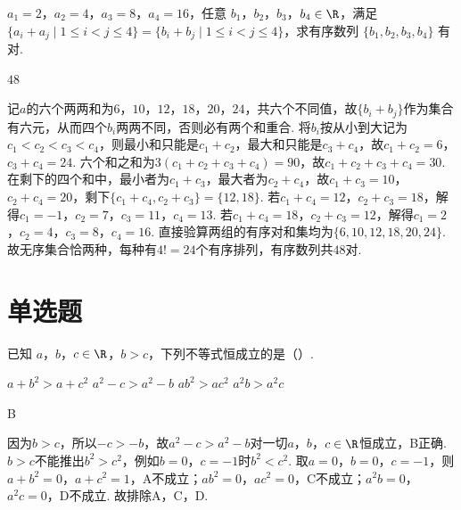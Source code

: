 \begin{problem}
\(a_1=2\)，\(a_2=4\)，\(a_3=8\)，\(a_4=16\)，任意 \(b_1\)，\(b_2\)，\(b_3\)，\(b_4\in \R\)，满足 \(\{a_i+a_j\mid 1\le i<j\le 4\}=\{b_i+b_j\mid 1\le i<j\le 4\}\)，求有序数列 \(\{b_1,b_2,b_3,b_4\}\) 有\fillinblank{} 对.
\end{problem}

\begin{answer}
\(48\)
\end{answer}

\begin{solution}
记\(a\)的六个两两和为\(6\)，\(10\)，\(12\)，\(18\)，\(20\)，\(24\)，共六个不同值，故\(\{b_{i}+b_{j}\}\)作为集合有六元，从而四个\(b_{i}\)两两不同，否则必有两个和重合. 将\(b_{i}\)按从小到大记为\(c_{1}<c_{2}<c_{3}<c_{4}\)，则最小和只能是\(c_{1}+c_{2}\)，最大和只能是\(c_{3}+c_{4}\)，故\(c_{1}+c_{2}=6\)，\(c_{3}+c_{4}=24\). 六个和之和为\(3(c_{1}+c_{2}+c_{3}+c_{4})=90\)，故\(c_{1}+c_{2}+c_{3}+c_{4}=30\). 在剩下的四个和中，最小者为\(c_{1}+c_{3}\)，最大者为\(c_{2}+c_{4}\)，故\(c_{1}+c_{3}=10\)，\(c_{2}+c_{4}=20\)，剩下\(\{c_{1}+c_{4},c_{2}+c_{3}\}=\{12,18\}\). 若\(c_{1}+c_{4}=12\)，\(c_{2}+c_{3}=18\)，解得\(c_{1}=-1\)，\(c_{2}=7\)，\(c_{3}=11\)，\(c_{4}=13\). 若\(c_{1}+c_{4}=18\)，\(c_{2}+c_{3}=12\)，解得\(c_{1}=2\)，\(c_{2}=4\)，\(c_{3}=8\)，\(c_{4}=16\). 直接验算两组的有序对和集均为\(\{6,10,12,18,20,24\}\). 故无序集合恰两种，每种有\(4!=24\)个有序排列，有序数列共\(48\)对.
\end{solution}
\section{单选题}

\begin{problem}
已知 \(a\)，\(b\)，\(c\in \R\)，\(b>c\)，下列不等式恒成立的是（\quad）.

\choices
    {\(a+b^2>a+c^2\)}
    {\(a^2-c>a^2-b\)}
    {\(ab^2>ac^2\)}
    {\(a^2b>a^2c\)}
\end{problem}

\begin{answer}
B
\end{answer}

\begin{solution}
因为\(b>c\)，所以\(-c>-b\)，故\(a^{2}-c>a^{2}-b\)对一切\(a\)，\(b\)，\(c\in\R\)恒成立，B正确. \(b>c\)不能推出\(b^{2}>c^{2}\)，例如\(b=0\)，\(c=-1\)时\(b^{2}<c^{2}\). 取\(a=0\)，\(b=0\)，\(c=-1\)，则\(a+b^{2}=0\)，\(a+c^{2}=1\)，A不成立；\(ab^{2}=0\)，\(ac^{2}=0\)，C不成立；\(a^{2}b=0\)，\(a^{2}c=0\)，D不成立. 故排除A，C，D.
\end{solution}

